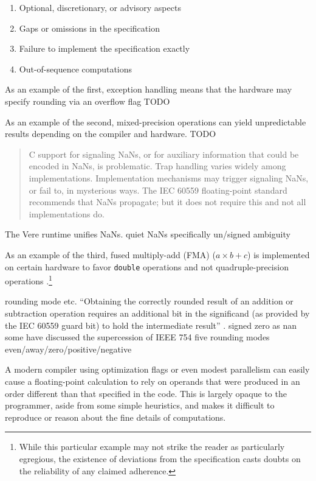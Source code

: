 \documentclass[twoside]{article}
\begin{document}
\begin{enumerate}
  \item  Optional, discretionary, or advisory aspects
  \item  Gaps or omissions in the specification
  \item  Failure to implement the specification exactly
  \item  Out-of-sequence computations
\end{enumerate}

As an example of the first, exception handling means that the hardware may specify rounding via an overflow flag TODO

As an example of the second, mixed-precision operations can yield unpredictable results depending on the compiler and hardware.  TODO

\begin{quote}
C support for signaling NaNs, or for auxiliary information that could be encoded in NaNs, is problematic.  Trap handling varies widely among implementations. Implementation mechanisms may trigger signaling NaNs, or fail to, in mysterious ways.  The IEC 60559 floating-point standard recommends that NaNs propagate; but it does not require this and not all implementations do.  \citep[p.~339]{Jones2008}
\end{quote}

The Vere runtime unifies NaNs.
quiet NaNs
specifically un/signed ambiguity

As an example of the third, fused multiply-add (FMA) ($a \times b + c$) is implemented on certain hardware to favor \texttt{double} operations and not quadruple-precision operations \citep[p.~5]{Kahan1997}.\footnote{While this particular example may not strike the reader as particularly egregious, the existence of deviations from the specification casts doubts on the reliability of any claimed adherence.}

rounding mode etc.
“Obtaining the correctly rounded result of an addition or subtraction operation requires an additional bit in the significand (as provided by the IEC 60559 guard bit) to hold the intermediate result” \citep[p.~65]{Jones2008}.
signed zero as nan
some have discussed the supercession of IEEE 754
five rounding modes even/away/zero/positive/negative

A modern compiler using optimization flags or even modest parallelism can easily cause a floating-point calculation to rely on operands that were produced in an order different than that specified in the code.  This is largely opaque to the programmer, aside from some simple heuristics, and makes it difficult to reproduce or reason about the fine details of computations.
\end{document}
